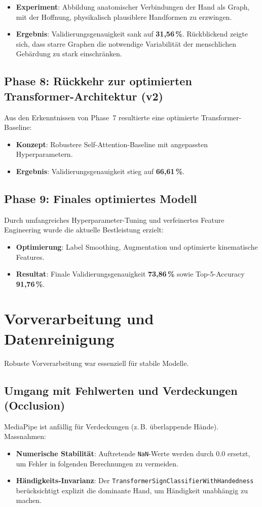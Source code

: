\begin{itemize}
    \item \textbf{Experiment}: Abbildung anatomischer Verbindungen der Hand als Graph, mit der Hoffnung, physikalisch plausiblere Handformen zu erzwingen.
    \item \textbf{Ergebnis}: Validierungsgenauigkeit sank auf \textbf{31,56\,\%}. Rückblickend zeigte sich, dass starre Graphen die notwendige Variabilität der menschlichen Gebärdung zu stark einschränken.
\end{itemize}

\subsection{Phase 8: Rückkehr zur optimierten Transformer-Architektur (v2)}
Aus den Erkenntnissen von Phase~7 resultierte eine optimierte Transformer-Baseline:
\begin{itemize}
    \item \textbf{Konzept}: Robustere Self-Attention-Baseline mit angepassten Hyperparametern.
    \item \textbf{Ergebnis}: Validierungsgenauigkeit stieg auf \textbf{66,61\,\%}.
\end{itemize}

\subsection{Phase 9: Finales optimiertes Modell}
Durch umfangreiches Hyperparameter-Tuning und verfeinertes Feature Engineering wurde die aktuelle Bestleistung erzielt:
\begin{itemize}
    \item \textbf{Optimierung}: Label Smoothing, Augmentation und optimierte kinematische Features.
    \item \textbf{Resultat}: Finale Validierungsgenauigkeit \textbf{73,86\,\%} sowie Top-5-Accuracy \textbf{91,76\,\%}.
\end{itemize}

\section{Vorverarbeitung und Datenreinigung}
Robuste Vorverarbeitung war essenziell für stabile Modelle.

\subsection{Umgang mit Fehlwerten und Verdeckungen (Occlusion)}
MediaPipe ist anfällig für Verdeckungen (z.\,B. überlappende Hände). Massnahmen:
\begin{itemize}
    \item \textbf{Numerische Stabilität}: Auftretende \texttt{NaN}-Werte werden durch $0.0$ ersetzt, um Fehler in folgenden Berechnungen zu vermeiden.
    \item \textbf{Händigkeits-Invarianz}: Der \texttt{TransformerSignClassifierWithHandedness} berücksichtigt explizit die dominante Hand, um Händigkeit unabhängig zu machen.
\end{itemize}

